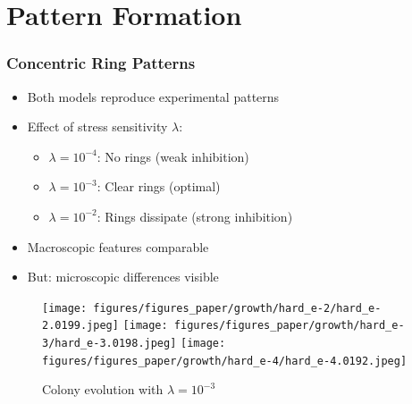 \documentclass[
	10pt,
	t
]{beamer}
\begin{document}
\section{Pattern Formation}

\begin{frame}
    \frametitle{Concentric Ring Patterns}

    \begin{itemize}
        \item Both models reproduce experimental patterns
        \item Effect of stress sensitivity $\lambda$:
              \begin{itemize}
                  \item $\lambda = 10^{-4}$: No rings (weak inhibition)
                  \item $\lambda = 10^{-3}$: Clear rings (optimal)
                  \item $\lambda = 10^{-2}$: Rings dissipate (strong inhibition)
              \end{itemize}
        \item Macroscopic features comparable
        \item But: microscopic differences visible
    \end{itemize}

    \vspace{0.2cm}

    \begin{figure}
        \centering
        \texttt{[image: figures/figures\_paper/growth/hard\_e-2/hard\_e-2.0199.jpeg]}
        \texttt{[image: figures/figures\_paper/growth/hard\_e-3/hard\_e-3.0198.jpeg]}
        \texttt{[image: figures/figures\_paper/growth/hard\_e-4/hard\_e-4.0192.jpeg]}
        \caption{\scriptsize{Colony evolution with $\lambda = 10^{-3}$}}
    \end{figure}

\end{frame}
\end{document}
